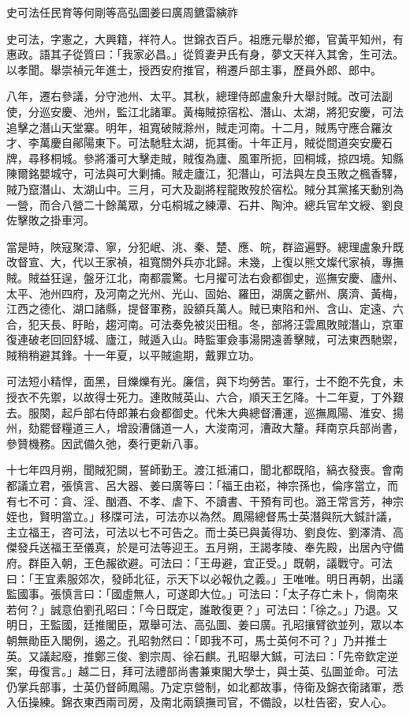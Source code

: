 
\begin{pinyinscope}
史可法任民育等何剛等高弘圖姜曰廣周鑣雷縯祚

史可法，字憲之，大興籍，祥符人。世錦衣百戶。祖應元舉於鄉，官黃平知州，有惠政。語其子從質曰：「我家必昌。」從質妻尹氏有身，夢文天祥入其舍，生可法。以孝聞。舉崇禎元年進士，授西安府推官，稍遷戶部主事，歷員外郎、郎中。

八年，遷右參議，分守池州、太平。其秋，總理侍郎盧象升大舉討賊。改可法副使，分巡安慶、池州，監江北諸軍。黃梅賊掠宿松、潛山、太湖，將犯安慶，可法追擊之潛山天堂寨。明年，祖寬破賊滁州，賊走河南。十二月，賊馬守應合羅汝才、李萬慶自鄖陽東下。可法馳駐太湖，扼其衝。十年正月，賊從間道突安慶石牌，尋移桐城。參將潘可大擊走賊，賊復為廬、風軍所扼，回桐城，掠四境。知縣陳爾銘嬰城守，可法與可大剿捕。賊走廬江，犯潛山，可法與左良玉敗之楓香驛，賊乃竄潛山、太湖山中。三月，可大及副將程龍敗歿於宿松。賊分其黨搖天動別為一營，而合八營二十餘萬眾，分屯桐城之練潭、石井、陶沖。總兵官牟文綬、劉良佐擊敗之掛車河。

當是時，陜寇聚漳、寧，分犯岷、洮、秦、楚、應、皖，群盜遍野。總理盧象升既改督宣、大，代以王家禎，祖寬關外兵亦北歸。未幾，上復以熊文燦代家禎，專撫賊。賊益狂逞，盤牙江北，南都震驚。七月擢可法右僉都御史，巡撫安慶、廬州、太平、池州四府，及河南之光州、光山、固始、羅田，湖廣之蘄州、廣濟、黃梅，江西之德化、湖口諸縣，提督軍務，設額兵萬人。賊已東陷和州、含山、定遠、六合，犯天長、盱眙，趨河南。可法奏免被災田租。冬，部將汪雲鳳敗賊潛山，京軍復連破老回回舒城、廬江，賊遁入山。時監軍僉事湯開遠善擊賊，可法東西馳禦，賊稍稍避其鋒。十一年夏，以平賊逾期，戴罪立功。

可法短小精悍，面黑，目爍爍有光。廉信，與下均勞苦。軍行，士不飽不先食，未授衣不先禦，以故得士死力。連敗賊英山、六合，順天王乞降。十二年夏，丁外艱去。服闋，起戶部右侍郎兼右僉都御史。代朱大典總督漕運，巡撫鳳陽、淮安、揚州，劾罷督糧道三人，增設漕儲道一人，大浚南河，漕政大釐。拜南京兵部尚書，參贊機務。因武備久弛，奏行更新八事。

十七年四月朔，聞賊犯闕，誓師勤王。渡江抵浦口，聞北都既陷，縞衣發喪。會南都議立君，張慎言、呂大器、姜曰廣等曰：「福王由崧，神宗孫也，倫序當立，而有七不可：貪、淫、酗酒、不孝、虐下、不讀書、干預有司也。潞王常言芳，神宗姪也，賢明當立。」移牒可法，可法亦以為然。鳳陽總督馬士英潛與阮大鋮計議，主立福王，咨可法，可法以七不可告之。而士英已與黃得功、劉良佐、劉澤清、高傑發兵送福王至儀真，於是可法等迎王。五月朔，王謁孝陵、奉先殿，出居內守備府。群臣入朝，王色赧欲避。可法曰：「王毋避，宜正受。」既朝，議戰守。可法曰：「王宜素服郊次，發師北征，示天下以必報仇之義。」王唯唯。明日再朝，出議監國事。張慎言曰：「國虛無人，可遂即大位。」可法曰：「太子存亡未卜，倘南來若何？」誠意伯劉孔昭曰：「今日既定，誰敢復更？」可法曰：「徐之。」乃退。又明日，王監國，廷推閣臣，眾舉可法、高弘圖、姜曰廣。孔昭攘臂欲並列，眾以本朝無勛臣入閣例，遏之。孔昭勃然曰：「即我不可，馬士英何不可？」乃并推士英。又議起廢，推鄭三俊、劉宗周、徐石麒。孔昭舉大鋮，可法曰：「先帝欽定逆案，毋復言。」越二日，拜可法禮部尚書兼東閣大學士，與士英、弘圖並命。可法仍掌兵部事，士英仍督師鳳陽。乃定京營制，如北都故事，侍衛及錦衣衛諸軍，悉入伍操練。錦衣東西兩司房，及南北兩鎮撫司官，不備設，以杜告密，安人心。


\end{pinyinscope}
